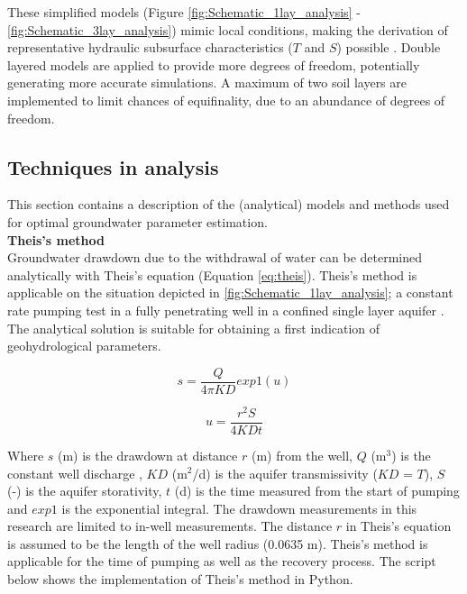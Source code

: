 These simplified models (Figure \ref{fig:Schematic_1lay_analysis} - \ref{fig:Schematic_3lay_analysis}) mimic local conditions, making the derivation of representative hydraulic subsurface characteristics ($T$ and $S$) possible \citep{Kruseman2000}. Double layered models are applied to provide more degrees of freedom, potentially generating more accurate simulations. A maximum of two soil layers are implemented to limit chances of equifinality, due to an abundance of degrees of freedom. \\ 

\subsection{Techniques in analysis}
\label{section:techniques_analysis}
This section contains a description of the (analytical) models and methods used for optimal groundwater parameter estimation. \\


\textbf{Theis's method} \\ 
Groundwater drawdown due to the withdrawal of water can be determined analytically with Theis's equation (Equation \ref{eq:theis}). Theis's method is applicable on the situation depicted in \ref{fig:Schematic_1lay_analysis}; a constant rate pumping test in a fully penetrating well in a confined single layer aquifer \citep{Kruseman2000}. The analytical solution is suitable for obtaining a first indication of geohydrological parameters.   

\begin{equation}
\label{eq:theis}
 s = \frac{Q}{4\pi K D} exp1(u)
\end{equation}

\begin{equation}
 u = \frac{r^{2} S}{4 K D t}
\end{equation}

Where $s$ (m) is the drawdown at distance $r$ (m) from the well, $Q$ (m$^{3}$) is the constant well discharge , $KD$ (m$^{2}$/d) is the aquifer transmissivity ($KD$ = $T$), $S$ (-) is the aquifer storativity, $t$ (d) is the time measured from the start of pumping and $exp1$ is the exponential integral. The drawdown measurements in this research are limited to in-well measurements. The distance $r$ in Theis's equation is assumed to be the length of the well radius (0.0635 m). Theis's method is applicable for the time of pumping as well as the recovery process. The script below shows the implementation of Theis's method in Python.\\

